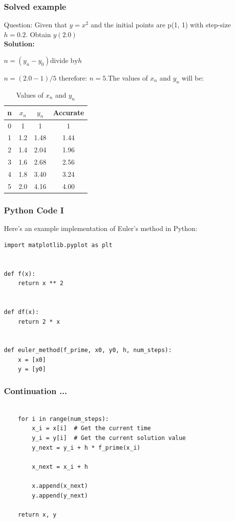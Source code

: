 \documentclass{beamer}
\begin{document}
\begin{frame}
  \frametitle{Solved example}
Question: Given that $y = x^2$ and the initial points are p(1, 1) with step-size $h = 0.2$. Obtain $y(2.0)$\\[11pt]
\textbf{Solution:}

$n = (y_n - y_0) \text{divide by} h$

$n = (2.0-1)/5$
$\text{therefore: } n = 5$.The values of $x_n$ and $y_n$ will be:

\begin{table}[H]
    \centering
    \begin{tabular}{|c|c|c|c|}
        \hline
         n&$x_n$&$y_n$&Accurate  \\ \hline
         0&1&1&1  \\ \hline 
         1&1.2&1.48&1.44  \\ \hline 
         2&1.4&2.04&1.96  \\ \hline 
         3&1.6&2.68&2.56  \\ \hline 
         4&1.8&3.40&3.24  \\ \hline 
         5&2.0&4.16&4.00  \\ \hline 
    \end{tabular}
    \caption{Values of $x_n$ and $y_n$ }
    \label{tab:my_label}
\end{table}

\end{frame}

\begin{frame}[fragile]
  \frametitle{Python Code I}

  Here's an example implementation of Euler's method in Python:

  \begin{verbatim}
import matplotlib.pyplot as plt


def f(x):
    return x ** 2


def df(x):
    return 2 * x


def euler_method(f_prime, x0, y0, h, num_steps):
    x = [x0]  
    y = [y0] 
  \end{verbatim}
\end{frame}

\begin{frame}[fragile]
  \frametitle{Continuation ...}
   \begin{verbatim}

    for i in range(num_steps):
        x_i = x[i]  # Get the current time
        y_i = y[i]  # Get the current solution value
        y_next = y_i + h * f_prime(x_i)

        x_next = x_i + h

        x.append(x_next)
        y.append(y_next)

    return x, y
    \end{verbatim}
\end{frame}
\end{document}

